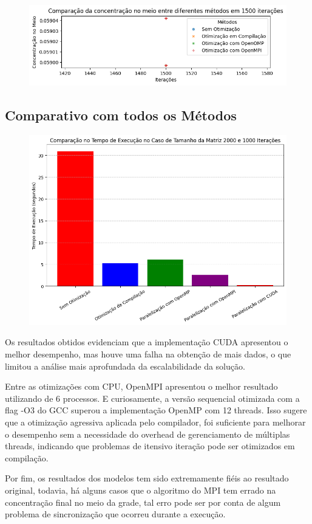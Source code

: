 \begin{figure}[H]
    \centering
    \includegraphics[width=1\linewidth]{../assets/C.png}
\end{figure}

\subsection{Comparativo com todos os Métodos}

\begin{figure}[H]
    \centering
    \includegraphics[width=1\linewidth]{../assets/Final.png}
\end{figure}

Os resultados obtidos evidenciam que a implementação CUDA apresentou o melhor desempenho, mas houve uma falha na obtenção de mais dados, o que limitou a análise mais aprofundada da escalabilidade da solução.

Entre as otimizações com CPU, OpenMPI apresentou o melhor resultado utilizando de 6 processos. E curiosamente, a versão sequencial otimizada com a flag -O3 do GCC superou a implementação OpenMP com 12 threads. Isso sugere que a otimização agressiva aplicada pelo compilador, foi suficiente para melhorar o desempenho sem a necessidade do overhead de gerenciamento de múltiplas threads, indicando que problemas de itensivo iteração pode ser otimizados em compilação.

Por fim, os resultados dos modelos tem sido extremamente fiéis ao resultado original, todavia, há alguns casos que o algoritmo do MPI tem errado na concentração final no meio da grade, tal erro pode ser por conta de algum problema de sincronização que ocorreu durante a execução.
